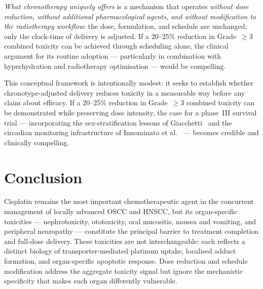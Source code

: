 \documentclass[preprint,review,12pt]{elsarticle}
\begin{document}
\emph{What chronotherapy uniquely offers} is a mechanism that operates
\emph{without dose reduction, without additional pharmacological agents,
and without modification to the radiotherapy workflow}: the dose, formulation,
and schedule are unchanged; only the clock-time of delivery is adjusted.
If a 20--25\% reduction in Grade~$\geq$3 combined toxicity can be achieved
through scheduling alone, the clinical argument for its routine adoption --- particularly in combination with hyperhydration and radiotherapy
optimisation --- would be compelling.

This conceptual framework is intentionally modest: it seeks to
establish whether chronotype-adjusted delivery reduces toxicity
in a measurable way before any claim about efficacy.  If a 20--25\%
reduction in Grade~$\geq$3 combined toxicity can be demonstrated
while preserving dose intensity, the case for a phase~III survival
trial --- incorporating the sex-stratification lessons of
Giacchetti~\cite{Giacchetti2006} and the circadian monitoring
infrastructure of Innominato et al.~\cite{Innominato2014} --- becomes
credible and clinically compelling.


\section{Conclusion}
\label{sec:conclusion}


Cisplatin remains the most important chemotherapeutic agent in the
concurrent management of locally advanced OSCC and HNSCC, but its
organ-specific toxicities --- nephrotoxicity, ototoxicity, oral mucositis,
nausea and vomiting, and peripheral neuropathy --- constitute the
principal barrier to treatment completion and full-dose delivery.
These toxicities are not interchangeable: each reflects a distinct
biology of transporter-mediated platinum uptake, localised adduct
formation, and organ-specific apoptotic response.  Dose reduction and
schedule modification address the aggregate toxicity signal but ignore
the mechanistic specificity that makes each organ differently vulnerable.
\end{document}
